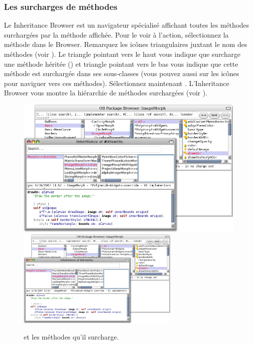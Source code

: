 \documentclass[a4paper,10pt,twoside]{book}
\begin{document}
\subsubsection{Les surcharges de méthodes}

Le Inheritance Browser est un navigateur spécialisé
affichant toutes les méthodes surchargées par la méthode affichée.
Pour le voir à l'action, sélectionnez la méthode
 dans le Browser.
Remarquez les icônes triangulaires juxtant le nom des méthodes (voir ).
Le triangle pointant vers le haut vous indique que 
 surcharge une méthode héritée
 (\ie {}) et triangle pointant vers le bas vous
 indique que cette méthode est surchargée dans ses sous-classes (vous
 pouvez aussi \click sur les icônes pour naviguer vers ces méthodes).
Sélectionnez maintenant .
L'Inheritance Browser vous montre la hiérarchie de méthodes
surchargées (voir ).

\begin{figure}[tbp]
	\begin{center}
   \ifluluelse
		{\includegraphics[width=\textwidth]{OBInheritanceOverriding}}
		{\includegraphics[width=0.7\textwidth]{OBInheritanceOverriding}}
	\end{center}
	\caption{ et les méthodes qu'il
      surcharge. } %
\end{figure}
\end{document}
